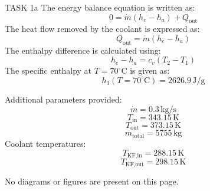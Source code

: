 TASK 1a  
The energy balance equation is written as:  
\[
0 = \dot{m} (h_e - h_a) + Q_{\text{out}}
\]  
The heat flow removed by the coolant is expressed as:  
\[
Q_{\text{out}} = \dot{m} (h_e - h_a)
\]  
The enthalpy difference is calculated using:  
\[
h_e - h_a = c_v (T_2 - T_1)
\]  
The specific enthalpy at \( T = 70^\circ\text{C} \) is given as:  
\[
h_3(T = 70^\circ\text{C}) = 2626.9 \, \text{J/g}
\]  

Additional parameters provided:  
\[
\dot{m} = 0.3 \, \text{kg/s}
\]  
\[
T_{\text{in}} = 343.15 \, \text{K}
\]  
\[
T_{\text{out}} = 373.15 \, \text{K}
\]  
\[
m_{\text{total}} = 5755 \, \text{kg}
\]  
Coolant temperatures:  
\[
T_{\text{KF,in}} = 288.15 \, \text{K}
\]  
\[
T_{\text{KF,out}} = 298.15 \, \text{K}
\]  

No diagrams or figures are present on this page.